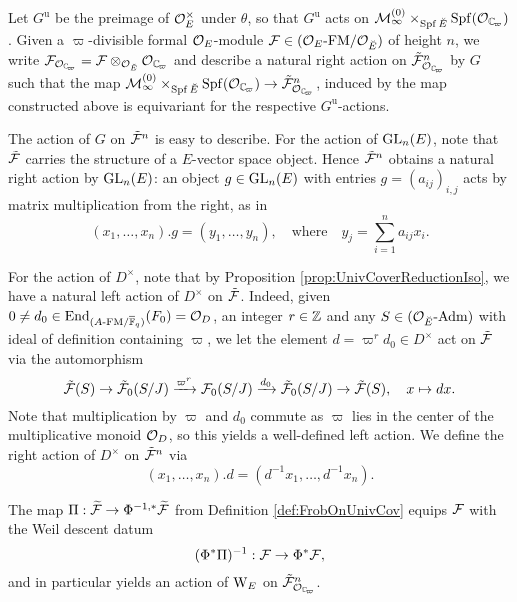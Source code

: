 \documentclass[../main.tex]{subfiles}
\begin{document}
Let $G^{\mathrm u}$ be the preimage of $\mathcal{O}_E^\times$ under $\theta$, so that 
$G^{\mathrm u}$ acts on $\cM_{\infty}^{(0)} \times_{\Spf \br E} \Spf(\cO_\Cp)$. 
Given a $\varpi$-divisible formal $\mathcal{O}_E$-module $\mathcal{F} \in {({\mathcal{O}_E}\textnormal-\allowbreak\mathrm{FM}/{\mathcal{O}_{{\breve {E}}}})}$ of height $n$, we write $\cF_{\cO_\Cp} = \cF \otimes_{\cO_\br E}
\cO_\Cp$ and describe a natural right action on $\tilde \cF_{\cO_\Cp}^n$ by $G$ 
such that the map $\cM_{\infty}^{(0)} \times_{\spf \br E} \Spf(\cO_\Cp) \to
\tilde \cF_{\cO_\Cp}^n$,
induced by the map constructed above is equivariant for the respective
$G^{\mathrm u}$-actions.

The action of $G$ on $\tilde {\mathcal{F}}^n$ is easy to describe. For the action of
$\operatorname{GL}_n(E)$, note that $\tilde {\mathcal{F}}$ carries the structure of a $E$-vector space
object. Hence $\tilde {\mathcal{F}}^n$ obtains a natural right action by $\operatorname{GL}_n(E)$: an
object $g \in \operatorname{GL}_n(E)$ with entries $g = (a_{ij})_{i,j}$ acts by matrix
multiplication from the right, as in 
\begin{equation}\label{eq:UnivCoverGLnAction}
  (x_1, \dots, x_n).g = (y_1, \dots, y_n), \quad
  \text{where} \quad y_j = \sum_{i=1}^n a_{ij} x_i. 
\end{equation}

For the action of $D^\times$, note that by Proposition
\ref{prop:UnivCoverReductionIso}, we have 
a natural left action of $D^\times$ on $\tilde {\mathcal{F}}$. 
Indeed, given $0 \neq d_0 \in \operatorname{End}_{{({A}\textnormal-\allowbreak\mathrm{FM}/{{\overline {\mathbb{F}}_q}})}}(F_0) = \mathcal{O}_D$, an
integer $r \in \mathbb{Z}$ and any $S \in {({\mathcal{O}_{\breve {E}}}\textnormal-\allowbreak\mathrm{Adm})}$ with ideal of definition
containing $\varpi$, 
we let the element $d = \varpi^r d_0 \in D^\times$ act on $\tilde {\mathcal{F}}$ via the
automorphism
\begin{equation*}
  \tilde {\mathcal{F}}(S) \to \tilde {\mathcal{F}}_0(S/J) \xrightarrow{\varpi^{r}} \mathcal{F}_0(S/J) \xrightarrow{d_0}
  \tilde {\mathcal{F}}_0(S/J) \to \tilde {\mathcal{F}}(S), \quad x \mapsto dx.
\end{equation*}
Note that multiplication by $\varpi$ and $d_0$ commute as $\varpi$ lies in the 
center of the multiplicative monoid $\mathcal{O}_D$, so this yields a well-defined
left action. We define the right action of $D^\times$ on $\tilde {\mathcal{F}}^n$ via
\begin{equation*}
  (x_1, \dots, x_n).d = (d^{-1} x_1, \dots, d^{-1} x_n).
\end{equation*}


The map $\Pi: \widetilde{\mathcal{F}} \to \Phi^{-1,*}\widetilde{\mathcal{F}}$ from Definition 
\ref{def:FrobOnUnivCov} equips $\mathcal{F}$ with the Weil descent datum
\begin{equation*}
  (\Phi^*{\Pi})^{-1}: \mathcal{F} \to \Phi^*\mathcal{F},
\end{equation*}
and in particular yields an action of $\mathrm W_E$ on $\tilde \cF_{\cO_\Cp}^n$. 
\end{document}
